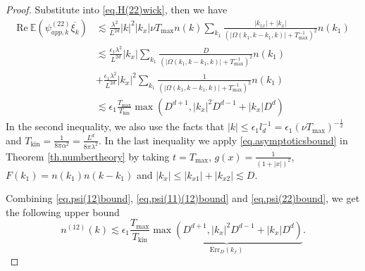\begin{proof}
Substitute into \eqref{eq.H(22)wick}, then we have
\begin{equation}\label{eq.psi(22)bound}
\begin{split}
    \text{Re}\  \mathbb E \left(\psi^{(22)}_{app,k}\overline{\xi_k}\right)&\lesssim\frac{\lambda^2}{L^{2d}} |k|^2|k_x|\nu T_{\text{max}}n(k)\sum\limits_{k_1} \frac{|k_{1x}|+|k_x|}{(|\Omega(k_1,k-k_1,k)|+T^{-1}_{\text{max}})^2}n(k_1)
    \\
    &\lesssim \frac{\epsilon_1\lambda^2}{L^{2d}}|k_x|\sum\limits_{k_1} \frac{D}{(|\Omega(k_1,k-k_1,k)|+T^{-1}_{\text{max}})^2}n(k_1)
    \\
    &+\frac{\epsilon_1\lambda^2}{L^{2d}}|k_x|^2\sum\limits_{k_1} \frac{1}{(|\Omega(k_1,k-k_1,k)|+T^{-1}_{\text{max}})^2}n(k_1)
    \\
    &\lesssim \epsilon_1\frac{T_{\text{max}}}{T_{\text{kin}}}\max(D^{d+1},|k_x|^2D^{d-1}+|k_x|D^{d})
\end{split}
\end{equation}
In the second inequality, we also use the facts that $|k|\le \epsilon_1 l_{d}^{-1}=\epsilon_1 (\nu T_{\text{max}})^{-\frac{1}{2}}$ and $T_{\text{kin}}=\frac{1}{8\pi\alpha^2}=\frac{L^{d}}{8\pi\lambda^2}$. In the last inequality we apply \eqref{eq.asymptoticsbound} in Theorem \ref{th.numbertheory} by taking $t=T_{\text{max}}$, $g(x)=\frac{1}{(1+|x|)^2}$, $F(k_1)=n(k_1) n(k-k_1)$ and $|k_x|\le |k_{x1}|+|k_{x2}|\lesssim D$. 


Combining \eqref{eq.psi(12)bound}, \eqref{eq.psi(11)(12)bound} and \eqref{eq.psi(22)bound}, we get the following upper bound
\begin{equation}\label{eq.n(12)final}
    n^{(12)}(k)\lesssim \epsilon_1\frac{T_{\text{max}}}{T_{\text{kin}}}\underbrace{\max(D^{d+1},|k_x|^2D^{d-1}+|k_x|D^{d})}_{\text{Err}_{D}(k_x)}.
\end{equation}


\end{proof}
